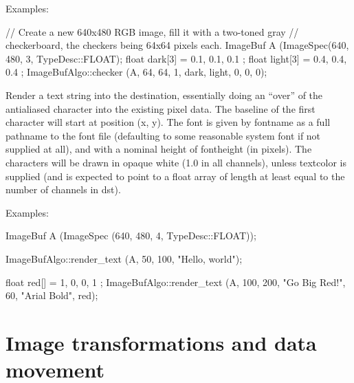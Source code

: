 \smallskip
\noindent Examples:
\begin{code}
    // Create a new 640x480 RGB image, fill it with a two-toned gray
    // checkerboard, the checkers being 64x64 pixels each.
    ImageBuf A (ImageSpec(640, 480, 3, TypeDesc::FLOAT);
    float dark[3] = { 0.1, 0.1, 0.1 };
    float light[3] = { 0.4, 0.4, 0.4 };
    ImageBufAlgo::checker (A, 64, 64, 1, dark, light, 0, 0, 0);
\end{code}
\apiend


 
Render a text string into the destination, essentially doing an ``over'' of
the antialiased character into the existing pixel data.  The baseline of the
first character will start at position ({\cf x, y}).  The font is given by
{\cf fontname} as a full pathname to the font file (defaulting to some
reasonable system font if not supplied at all), and with a nominal
height of {\cf fontheight} (in pixels).  The characters will be drawn in
opaque white (1.0 in all channels), unless {\cf textcolor} is
supplied (and is expected to point to a {\cf float} array of length at
least equal to the number of channels in {\cf dst}).

\smallskip
\noindent Examples:
\begin{code}
    ImageBuf A (ImageSpec (640, 480, 4, TypeDesc::FLOAT));

    ImageBufAlgo::render_text (A, 50, 100, "Hello, world");

    float red[] = { 1, 0, 0, 1 };
    ImageBufAlgo::render_text (A, 100, 200, "Go Big Red!",
                               60, "Arial Bold", red);
\end{code}
\apiend





\section{Image transformations and data movement}
\label{sec:iba:transforms}

 

